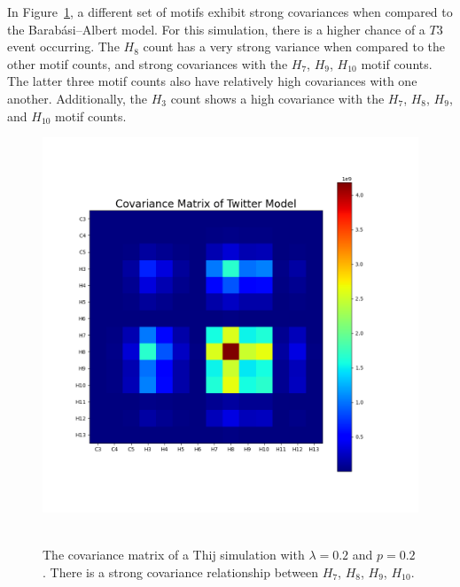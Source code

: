 In Figure~\ref{fig:covmat0202}, a different set of motifs exhibit strong covariances when compared to
the Barabási–Albert model. For this simulation, there is a higher chance of a $T3$ event occurring. 
The $H_8$ count has a very strong variance when compared to the other motif counts, and strong covariances
with the $H_7$, $H_9$, $H_{10}$ motif counts. The latter three motif counts also have relatively high covariances with one another.  
Additionally, the $H_3$ count shows a high covariance with the $H_7$, $H_8$, $H_9$, and $H_{10}$ motif counts.



\begin{figure}
    \includegraphics[width=0.9\linewidth]{Images/CovMatTwitterModel020209.png}\
    \centering
    \caption{The covariance matrix of a Thij simulation with $\lambda=0.2$ and $p=0.2$. There is 
    a strong covariance relationship between $H_{7}$, $H_{8}$, $H_{9}$, $H_{10}$.}
    \label{fig:covmat0202}
\end{figure}


